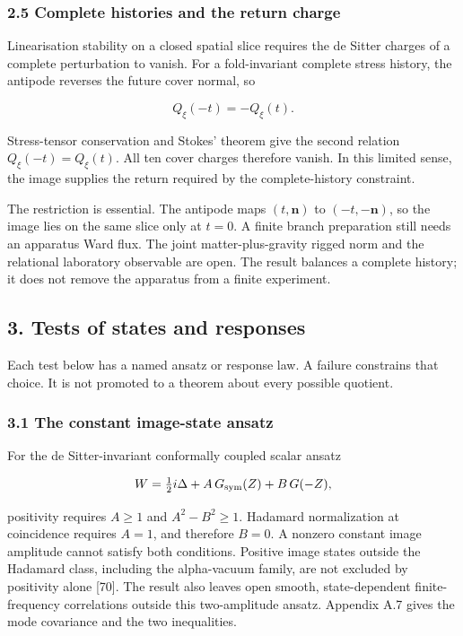 \documentclass[
]{article}
\begin{document}
\subsubsection{2.5 Complete histories and the return
charge}\label{complete-histories-and-the-return-charge}

Linearisation stability on a closed spatial slice requires the de Sitter
charges of a complete perturbation to vanish. For a fold-invariant
complete stress history, the antipode reverses the future cover normal,
so

\[
Q_\xi(-t)=-Q_\xi(t).
\]

Stress-tensor conservation and Stokes' theorem give the second relation
\(Q_\xi(-t)=Q_\xi(t)\). All ten cover charges therefore vanish. In this
limited sense, the image supplies the return required by the
complete-history constraint.

The restriction is essential. The antipode maps \((t,\mathbf n)\) to
\((-t,-\mathbf n)\), so the image lies on the same slice only at
\(t=0\). A finite branch preparation still needs an apparatus Ward flux.
The joint matter-plus-gravity rigged norm and the relational laboratory
observable are open. The result balances a complete history; it does not
remove the apparatus from a finite experiment.

\subsection{3. Tests of states and
responses}\label{tests-of-states-and-responses}

Each test below has a named ansatz or response law. A failure constrains
that choice. It is not promoted to a theorem about every possible
quotient.

\subsubsection{3.1 The constant image-state
ansatz}\label{the-constant-image-state-ansatz}

For the de Sitter-invariant conformally coupled scalar ansatz

\[
W=\tfrac12 i\Delta+A\,G_{\rm sym}(Z)+B\,G(-Z),
\]

positivity requires \(A\geq1\) and \(A^2-B^2\geq1\). Hadamard
normalization at coincidence requires \(A=1\), and therefore \(B=0\). A
nonzero constant image amplitude cannot satisfy both conditions.
Positive image states outside the Hadamard class, including the
alpha-vacuum family, are not excluded by positivity alone {[}70{]}. The
result also leaves open smooth, state-dependent finite-frequency
correlations outside this two-amplitude ansatz. Appendix A.7 gives the
mode covariance and the two inequalities.
\end{document}
